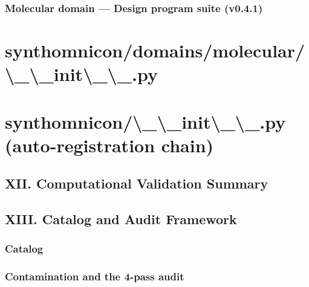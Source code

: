 \documentclass{article[11pt,letterpaper]}
\begin{document}
\subsubsection{Molecular domain — Design program suite (v0.4.1)}
\label{sec:molecular-domain--design-program-suite-v041}


\section{synthomnicon/domains/molecular/\textbackslash{}_\textbackslash{}_init\textbackslash{}_\textbackslash{}_.py}
\label{sec:synthomnicondomainsmolecularinitpy}


\section{synthomnicon/\textbackslash{}_\textbackslash{}_init\textbackslash{}_\textbackslash{}_.py  (auto-registration chain)}
\label{sec:synthomniconinitpy--auto-registration-chain}


\subsection{XII. Computational Validation Summary}
\label{sec:xii-computational-validation-summary}


\subsection{XIII. Catalog and Audit Framework}
\label{sec:xiii-catalog-and-audit-framework}


\subsubsection{Catalog}
\label{sec:catalog}


\subsubsection{Contamination and the 4-pass audit}
\label{sec:contamination-and-the-4-pass-audit}
\end{document}
